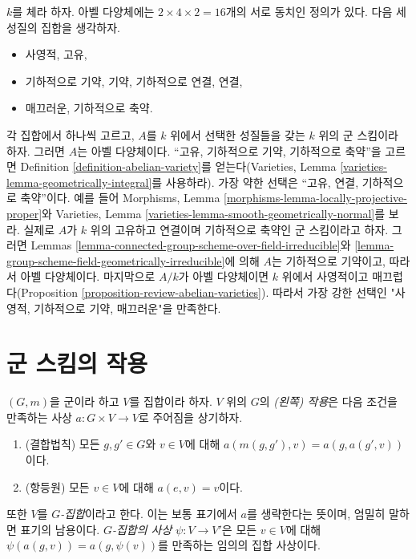 \begin{remark}
\label{remark-16-equivalent}
$k$를 체라 하자. 아벨 다양체에는 $2 \times 4 \times 2 = 16$개의 서로 동치인 정의가 있다. 다음 세 성질의 집합을 생각하자.
\begin{itemize}
\item 사영적, 고유,
\item 기하적으로 기약, 기약, 기하적으로 연결, 연결,
\item 매끄러운, 기하적으로 축약.
\end{itemize}
각 집합에서 하나씩 고르고, $A$를 $k$ 위에서 선택한 성질들을 갖는 $k$ 위의 군 스킴이라 하자.
그러면 $A$는 아벨 다양체이다. ``고유, 기하적으로 기약, 기하적으로 축약''을 고르면 Definition
\ref{definition-abelian-variety}를 얻는다(Varieties, Lemma
\ref{varieties-lemma-geometrically-integral}를 사용하라). 가장 약한 선택은 ``고유, 연결, 기하적으로 축약''이다.
예를 들어 Morphisms, Lemma \ref{morphisms-lemma-locally-projective-proper}와 Varieties, Lemma
\ref{varieties-lemma-smooth-geometrically-normal}를 보라. 실제로 $A$가 $k$ 위의 고유하고 연결이며 기하적으로 축약인
군 스킴이라고 하자. 그러면 Lemmas \ref{lemma-connected-group-scheme-over-field-irreducible}와
\ref{lemma-group-scheme-field-geometrically-irreducible}에 의해 $A$는 기하적으로 기약이고, 따라서 아벨 다양체이다.
마지막으로 $A/k$가 아벨 다양체이면 $k$ 위에서 사영적이고 매끄럽다(Proposition
\ref{proposition-review-abelian-varieties}). 따라서 가장 강한 선택인 "사영적, 기하적으로 기약, 매끄러운"을 만족한다.
\end{remark}







\section{군 스킴의 작용}
\label{section-action-group-scheme}

\noindent
$(G, m)$을 군이라 하고 $V$를 집합이라 하자. $V$ 위의 $G$의 {\it (왼쪽) 작용}은 다음 조건을 만족하는 사상
$a : G \times V \to V$로 주어짐을 상기하자.
\begin{enumerate}
\item (결합법칙) 모든 $g, g' \in G$와 $v \in V$에 대해
$a(m(g, g'), v) = a(g, a(g', v))$이다.
\item (항등원) 모든 $v \in V$에 대해 $a(e, v) = v$이다.
\end{enumerate}
또한 $V$를 {\it $G$-집합}이라고 한다. 이는 보통 표기에서 $a$를 생략한다는 뜻이며, 엄밀히 말하면 표기의 남용이다.
{\it $G$-집합의 사상} $\psi : V \to V'$은 모든 $v \in V$에 대해
$\psi(a(g, v)) = a(g, \psi(v))$를 만족하는 임의의 집합 사상이다.

